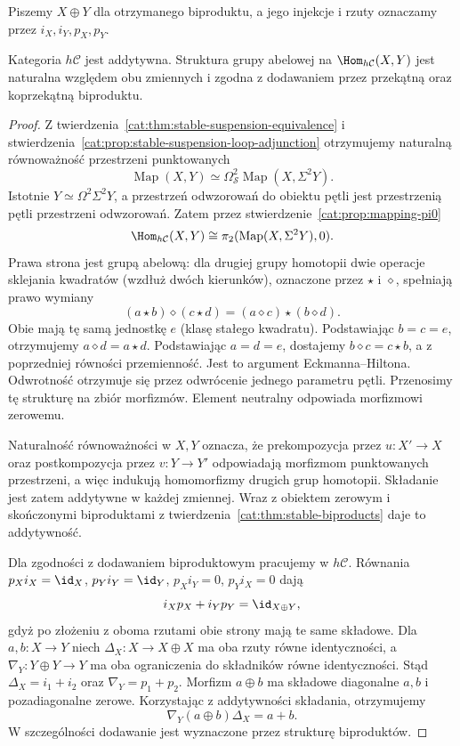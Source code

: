 Piszemy $X\oplus Y$ dla otrzymanego biproduktu, a jego injekcje i rzuty oznaczamy przez $i_X,i_Y,p_X,p_Y$.

\begin{twierdzenie}[Addytywność]\label{cat:thm:stable-homotopy-additive}
Kategoria $h\mathcal C$ jest addytywna. Struktura grupy abelowej na $\Hom_{h\mathcal C}(X,Y)$ jest naturalna względem obu zmiennych i zgodna z dodawaniem przez przekątną oraz koprzekątną biproduktu.
\end{twierdzenie}
\begin{proof}
Z twierdzenia~\ref{cat:thm:stable-suspension-equivalence} i stwierdzenia~\ref{cat:prop:stable-suspension-loop-adjunction} otrzymujemy naturalną równoważność przestrzeni punktowanych
\[
 \operatorname{Map}(X,Y)\simeq
 \Omega_{\mathcal S}^2\operatorname{Map}(X,\Sigma^2Y).
\]
Istotnie $Y\simeq\Omega^2\Sigma^2Y$, a przestrzeń odwzorowań do obiektu pętli jest przestrzenią pętli przestrzeni odwzorowań. Zatem przez stwierdzenie~\ref{cat:prop:mapping-pi0}
\[
 \Hom_{h\mathcal C}(X,Y)
 \cong \pi_2(\operatorname{Map}(X,\Sigma^2Y),0).
\]
Prawa strona jest grupą abelową: dla drugiej grupy homotopii dwie operacje sklejania kwadratów (wzdłuż dwóch kierunków), oznaczone przez $\star$ i $\diamond$, spełniają prawo wymiany
\[
 (a\star b)\diamond(c\star d)
 =(a\diamond c)\star(b\diamond d).
\]
Obie mają tę samą jednostkę $e$ (klasę stałego kwadratu). Podstawiając $b=c=e$, otrzymujemy $a\diamond d=a\star d$. Podstawiając $a=d=e$, dostajemy $b\diamond c=c\star b$, a z poprzedniej równości przemienność. Jest to argument Eckmanna--Hiltona. Odwrotność otrzymuje się przez odwrócenie jednego parametru pętli. Przenosimy tę strukturę na zbiór morfizmów. Element neutralny odpowiada morfizmowi zerowemu.

Naturalność równoważności w $X,Y$ oznacza, że prekompozycja przez $u:X'\to X$ oraz postkompozycja przez $v:Y\to Y'$ odpowiadają morfizmom punktowanych przestrzeni, a więc indukują homomorfizmy drugich grup homotopii. Składanie jest zatem addytywne w każdej zmiennej. Wraz z obiektem zerowym i skończonymi biproduktami z twierdzenia~\ref{cat:thm:stable-biproducts} daje to addytywność.

Dla zgodności z dodawaniem biproduktowym pracujemy w $h\mathcal C$. Równania $p_Xi_X=\id_X$, $p_Yi_Y=\id_Y$, $p_Xi_Y=0$, $p_Yi_X=0$ dają
\[
 i_Xp_X+i_Yp_Y=\id_{X\oplus Y},
\]
gdyż po złożeniu z oboma rzutami obie strony mają te same składowe. Dla $a,b:X\to Y$ niech $\Delta_X:X\to X\oplus X$ ma oba rzuty równe identyczności, a $\nabla_Y:Y\oplus Y\to Y$ ma oba ograniczenia do składników równe identyczności. Stąd $\Delta_X=i_1+i_2$ oraz $\nabla_Y=p_1+p_2$. Morfizm $a\oplus b$ ma składowe diagonalne $a,b$ i pozadiagonalne zerowe. Korzystając z addytywności składania, otrzymujemy
\[
 \nabla_Y(a\oplus b)\Delta_X=a+b.
\]
W szczególności dodawanie jest wyznaczone przez strukturę biproduktów.
\end{proof}

